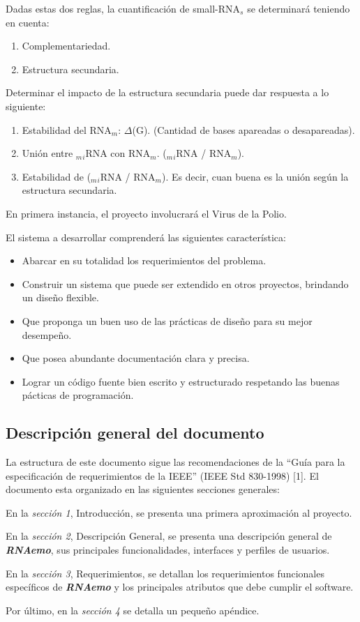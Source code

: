 \documentclass[12pt,a4paper,english,spanish]{article}
\newcommand{\rnaemo}{\textbf{\emph{RNAemo}}}
\begin{document}
\par Dadas estas dos reglas, la cuantificación de small-RNA$_s$ se determinará teniendo en cuenta:
\begin{enumerate}
	\item Complementariedad.
	\item Estructura secundaria.
\end{enumerate}

Determinar el impacto de la estructura secundaria puede dar respuesta a lo siguiente:
\begin{enumerate}
	\item Estabilidad del RNA$_m$: $\Delta$(G). (Cantidad de bases apareadas o desapareadas).
	\item Unión entre $_m$$_i$RNA con RNA$_m$. ($_m$$_i$RNA / RNA$_m$).
	\item Estabilidad de ($_m$$_i$RNA / RNA$_m$). Es decir, cuan buena es la unión según la estructura secundaria.
\end{enumerate}
En primera instancia, el proyecto involucrará el Virus de la Polio. 

\par El sistema a desarrollar comprenderá las siguientes característica:
\begin{itemize}
	\item Abarcar en su totalidad los requerimientos del problema.
	\item Construir un sistema que puede ser extendido en otros proyectos, brindando un diseño flexible. 
	\item Que proponga un buen uso de las prácticas de diseño para su mejor desempeño.
	\item Que posea abundante documentación clara y precisa.
	\item Lograr un código fuente bien escrito y estructurado respetando las buenas pácticas de programación.
\end{itemize}

\subsection{Descripción general del documento}
\par La estructura de este documento sigue las recomendaciones de la ``Guía para
la especificación de requerimientos de la IEEE'' (IEEE Std 830-1998) [1].
El documento esta organizado en las siguientes secciones generales: 
\par En la \textit{sección 1}, Introducción, se presenta una primera aproximación al proyecto. 
\par En la \textit{sección 2}, Descripción General, se presenta una descripción general de \rnaemo, sus principales
funcionalidades, interfaces y perfiles de usuarios. 
\par En la \textit{sección 3}, Requerimientos, se detallan los requerimientos funcionales específicos de \textbf{\emph{RNAemo}} y
 los principales atributos que debe cumplir el software.
\par Por último, en la \textit{sección 4} se detalla un pequeño apéndice.
\end{document}
